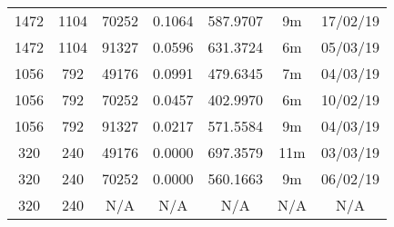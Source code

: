 \begin{center}
\begin{tabular}{ c c c | c | c c c }
  1472 & 1104 & 70252 & 0.1064 & 587.9707 & 9m & 17/02/19 \\
  1472 & 1104 & 91327 & 0.0596 & 631.3724 & 6m & 05/03/19 \\
  1056 & 792 & 49176 & 0.0991 & 479.6345 & 7m & 04/03/19 \\
  1056 & 792 & 70252 & 0.0457 & 402.9970 & 6m & 10/02/19 \\
  1056 & 792 & 91327 & 0.0217 & 571.5584 & 9m & 04/03/19 \\
  320 & 240 & 49176 & 0.0000 & 697.3579 & 11m & 03/03/19 \\
  320 & 240 & 70252 & 0.0000 & 560.1663 & 9m & 06/02/19 \\
  320 & 240 & N/A & N/A & N/A & N/A & N/A \\
  \end{tabular}
  \end{center}